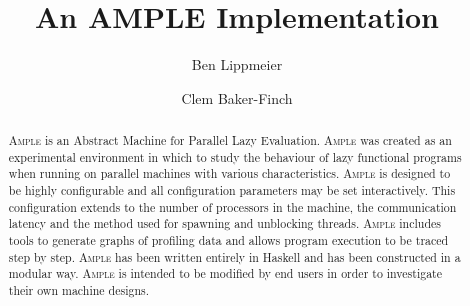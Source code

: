 \documentclass{llncs}
\begin{document}
\newcommand\ample{A\textsc{mple} }
\newcommand\gransim{G\textsc{ran}S\textsc{im}}


\title{An AMPLE Implementation}

\author{Ben Lippmeier \and Clem Baker-Finch}


\maketitle


\begin{abstract}
\ample is an Abstract Machine for Parallel Lazy Evaluation. \ample was created as an experimental environment in which to study the behaviour of lazy functional programs when running on parallel machines with various characteristics. \ample is designed to be highly configurable and all configuration parameters may be set interactively. This configuration extends to the number of processors in the machine, the communication latency and the method used for spawning and unblocking threads. \ample includes tools to generate graphs of profiling data and allows program execution to be traced step by step. \ample has been written entirely in Haskell and has been constructed in a modular way. \ample is intended to be modified by end users in order to investigate their own machine designs.

\end{abstract}



%

\newcommand\rrule[9] {
	\noindent \textbf{#1}
	\par
	\medskip
	\noindent
	\begin{tabular} {p{ 5mm} p{ 2mm} p{20mm} p{25mm} p{15mm} p{ 3mm} p{42mm}}
			& ( & #2, & \raggedleft{#3}, & \raggedleft{#4} & ) & #5\\
	$\Rightarrow$	& ( & #6, & \raggedleft{#7}, & \raggedleft{#8} & ) & #9
	\end{tabular}
	\\
}	


\newcommand\rruleCfSE[9] {
	\noindent \textbf{#1}
	\par
	\medskip
	\noindent
	\begin{tabular} {p{ 5mm} p{ 2mm} p{30mm} p{20mm} p{10mm} p{ 3mm} p{42mm}}
			& ( & #2, & \raggedleft{#3}, & \raggedleft{#4} & ) & #5\\
	$\Rightarrow$	& ( & #6, & \raggedleft{#7}, & \raggedleft{#8} & ) & #9
	\end{tabular}
	\\
}	
\end{document}
